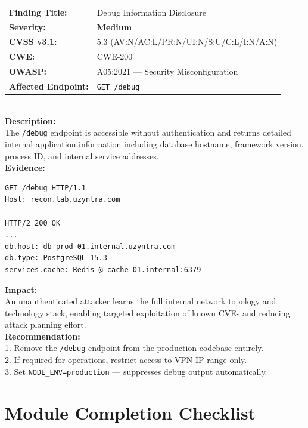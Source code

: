 \begin{tcolorbox}[findingstyle]
\begin{tabular}{ll}
\textbf{Finding Title:} & Debug Information Disclosure \\
\textbf{Severity:} & \textcolor{uzyellow}{\textbf{Medium}} \\
\textbf{CVSS v3.1:} & 5.3 (AV:N/AC:L/PR:N/UI:N/S:U/C:L/I:N/A:N) \\
\textbf{CWE:} & CWE-200 \\
\textbf{OWASP:} & A05:2021 — Security Misconfiguration \\
\textbf{Affected Endpoint:} & \texttt{GET /debug} \\
\end{tabular}\\[8pt]
\textbf{Description:}\\
The \texttt{/debug} endpoint is accessible without authentication and returns detailed internal application information including database hostname, framework version, process ID, and internal service addresses.\\[6pt]
\textbf{Evidence:}\\
\begin{lstlisting}[style=http]
GET /debug HTTP/1.1
Host: recon.lab.uzyntra.com

HTTP/2 200 OK
...
db.host: db-prod-01.internal.uzyntra.com
db.type: PostgreSQL 15.3
services.cache: Redis @ cache-01.internal:6379
\end{lstlisting}
\textbf{Impact:}\\
An unauthenticated attacker learns the full internal network topology and technology stack, enabling targeted exploitation of known CVEs and reducing attack planning effort.\\[6pt]
\textbf{Recommendation:}\\
1. Remove the \texttt{/debug} endpoint from the production codebase entirely.\\
2. If required for operations, restrict access to VPN IP range only.\\
3. Set \texttt{NODE\_ENV=production} — suppresses debug output automatically.
\end{tcolorbox}

\section{Module Completion Checklist}

